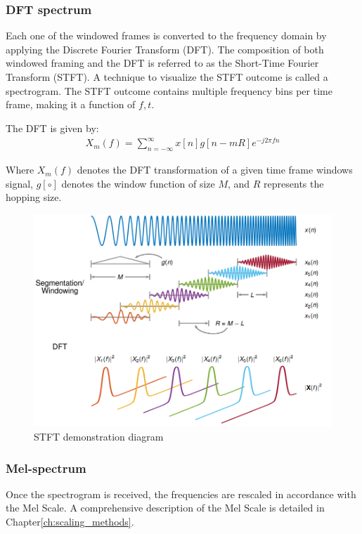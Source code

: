 \subsubsection{DFT spectrum}
Each one of the windowed frames is
converted to the frequency domain by applying the 
Discrete Fourier Transform (DFT).
The composition of both windowed framing 
and the DFT is referred to as the 
Short-Time Fourier Transform (STFT).
A technique to visualize the STFT outcome is 
called a spectrogram. The STFT outcome contains 
multiple frequency bins per time frame,
making it a function of \(f, t\).

The DFT is given by:
\begin{align}
    X_{m}(f) = \sum_{n=-\infty}^{\infty} x[n]g[n-mR]e^{-j2\pi fn}
\end{align}

Where \(X_{m}(f)\) denotes the DFT transformation of
a given time frame windows signal,
\(g[\circ]\) denotes the window function of size \(M\),
and \(R\) represents the hopping size.

\begin{figure}[H]
    \centering
    \includegraphics[width=\linewidth]{Features/images/iscola_stft}
    \caption{STFT demonstration diagram}\label{fig:iscola_stft}
\end{figure}

\subsubsection{Mel-spectrum}
Once the spectrogram is received, 
the frequencies are rescaled in accordance with the Mel Scale.
A comprehensive description of the Mel Scale 
is detailed in Chapter\;\ref{ch:scaling_methods}.

